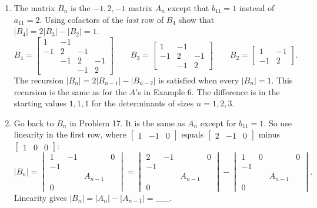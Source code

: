 \documentclass[14pt, a4paper]{article}
\begin{document}
\begin{enumerate}[resume]
    \item The matrix $B_n$ is the $-1, 2, -1$ matrix $A_n$ except that $b_{11} = 1$ instead of $a_{11} = 2$. Using cofactors of the \textit{last} row of $B_4$ show that $|B_4| = 2|B_3| - |B_2| = 1$.
          \[
              B_4 = \begin{bmatrix} 1 & -1 & & \\ -1 & 2 & -1 & \\ & -1 & 2 & -1 \\ & & -1 & 2 \end{bmatrix} \qquad
              B_3 = \begin{bmatrix} 1 & -1 & \\ -1 & 2 & -1 \\ & -1 & 2 \end{bmatrix} \qquad
              B_2 = \begin{bmatrix} 1 & -1 \\ -1 & 2 \end{bmatrix} .
          \]
          The recursion $|B_n| = 2|B_{n-1}| - |B_{n-2}|$ is satisfied when every $|B_n| = 1$. This recursion is the same as for the $A$'s in Example 6. The difference is in the starting values $1, 1, 1$ for the determinants of sizes $n = 1, 2, 3$.

    \item Go back to $B_n$ in Problem 17. It is the same as $A_n$ except for $b_{11} = 1$. So use linearity in the first row, where $\begin{bmatrix} 1 & -1 & 0 \end{bmatrix}$ equals $\begin{bmatrix} 2 & -1 & 0 \end{bmatrix}$ minus $\begin{bmatrix} 1 & 0 & 0 \end{bmatrix}$:
          \[
              |B_n| = \begin{vmatrix} 1 & -1 & & 0 \\ -1 & & & \\ & & A_{n-1} & \\ 0 & & & \end{vmatrix} =
              \begin{vmatrix} 2 & -1 & & 0 \\ -1 & & & \\ & & A_{n-1} & \\ 0 & & & \end{vmatrix} -
              \begin{vmatrix} 1 & 0 & & 0 \\ -1 & & & \\ & & A_{n-1} & \\ 0 & & & \end{vmatrix} .
          \]
          Linearity gives $|B_n| = |A_n| - |A_{n-1}| = \_\_\_\_\_$.


\end{enumerate}
\end{document}
